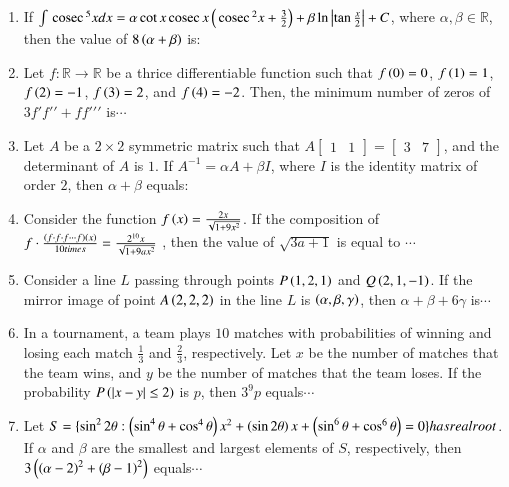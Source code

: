 \documentclass[journal,12pt,twocolumn]{IEEEtran}
\theoremstyle{remark}
\begin{document}
\begin{enumerate}[start=16]
    \item If $\int \,\text{cosec}\,^5 x dx = \alpha \cot x \,\text{cosec}\, x\left(\,\text{cosec}\,^2 x +\frac{3}{2}\right) + \beta\ln\left\vert \tan \frac{x}{2}\right\vert + C$, where $\alpha, \beta \in \mathbb{R}$, then the value of $8\left(\alpha + \beta\right)$ is:
    

    \item Let $f : \mathbb{R} \to \mathbb{R}$ be a thrice differentiable function such that $f\left(0\right) = 0$, $f\left(1\right) = 1$, $f\left(2\right) = -1$, $f\left(3\right) = 2$, and $f\left(4\right) = -2$. Then, the minimum number of zeros of $3f\prime f\prime\prime+ff\prime\prime\prime$ is$\cdots$
    

    \item Let $A$ be a $2 \times 2$ symmetric matrix such that $A  \begin{bmatrix} 1 & 1 \end{bmatrix}=\begin{bmatrix} 3 & 7     \end{bmatrix}$, and the determinant of $A$ is $1$. If $A^{-1} = \alpha A + \beta I$, where $I$ is the identity matrix of order $2$, then $\alpha + \beta$ equals:
   
	    \item Consider the function $f\left(x\right) = \frac{2x}{\sqrt{1 + 9x^2}}$. If the composition of $f\cdot\frac{\left(f\cdot f \cdot f \cdots f\right)\left(x\right)}{10 times}=\frac{2^{10}x}{\sqrt{1+9ax^2}}$ , then the value of $\sqrt{3a+1}$ is equal to $\cdots$
    

    \item Consider a line $L$ passing through points $P\left(1, 2, 1\right)$ and $Q\left(2, 1, -1\right)$. If the mirror image of point $A\left(2, 2, 2\right)$ in the line $L$ is $\left(\alpha, \beta, \gamma\right)$, then $\alpha + \beta + 6\gamma$ is$\cdots$
    

    \item In a tournament, a team plays $10$ matches with probabilities of winning and losing each match $\frac{1}{3}$ and $\frac{2}{3}$, respectively. Let $x$ be the number of matches that the team wins, and $y$ be the number of matches that the team loses. If the probability $P\left(\left\vert x - y\right\vert \leq 2\right)$ is $p$, then $3^9p$ equals$\cdots$
   

    \item Let $S = \{ \sin^2 2\theta:\left(\sin^4 \theta +\cos^4
	    \theta\right)x^2+\left( \sin2 \theta\right)x +\left(\sin^6 \theta+  \cos^6\theta\right) = 0 \} has real root$. If $\alpha$ and $\beta$ are the smallest and largest elements of $S$, respectively, then $3\left(\left(\alpha - 2\right)^2 + \left(\beta - 1\right)^2\right)$ equals$\cdots$
    



\end{enumerate}
\end{document}
